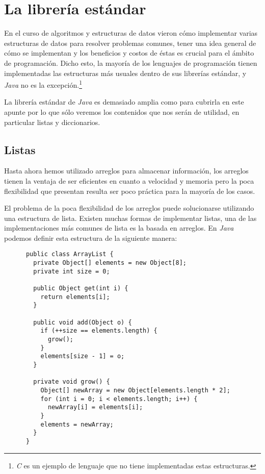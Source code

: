 \section{La librería estándar}
  En el curso de algoritmos y estructuras de datos vieron cómo implementar varias estructuras de 
  datos para resolver problemas comunes, tener una idea general de cómo se implementan y los 
  beneficios y costos de éstas es crucial para el ámbito de programación.
  Dicho esto, la mayoría de los lenguajes de programación tienen implementadas las estructuras más
  usuales dentro de sus librerías estándar, y \textit{Java} no es la excepción.\footnote{\textit{C} 
  es un ejemplo de lenguaje que no tiene implementadas estas estructuras.}

  La librería estándar de \textit{Java} es demasiado amplia como para cubrirla en este apunte por lo
  que sólo veremos los contenidos que nos serán de utilidad, en particular listas y diccionarios.

  \subsection{Listas}
    Hasta ahora hemos utilizado arreglos para almacenar información, los arreglos tienen la ventaja
    de ser eficientes en cuanto a velocidad y memoria pero la poca flexibilidad que presentan 
    resulta ser poco práctica para la mayoría de los casos.

    El problema de la poca flexibilidad de los arreglos puede solucionarse utilizando una estructura
    de lista.
    Existen muchas formas de implementar listas, una de las implementaciones más comunes de lista es
    la basada en arreglos.
    En \textit{Java} podemos definir esta estructura de la siguiente manera:

    \begin{verbatim}
      public class ArrayList {
        private Object[] elements = new Object[8];
        private int size = 0;

        public Object get(int i) {
          return elements[i];
        }

        public void add(Object o) {
          if (++size == elements.length) {
            grow();
          }
          elements[size - 1] = o;
        }

        private void grow() {
          Object[] newArray = new Object[elements.length * 2];
          for (int i = 0; i < elements.length; i++) {
            newArray[i] = elements[i];
          }
          elements = newArray;
        }
      }
    \end{verbatim}

